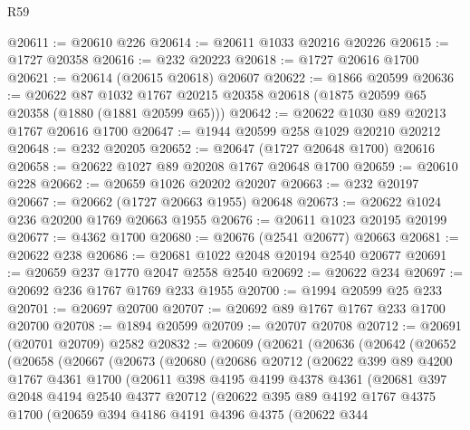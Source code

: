 \begin{lexlean}{R59}
\begin{coremodule}
@20611 := @20610 @226
@20614 := @20611 @1033 @20216 @20226
@20615 := @1727 @20358
@20616 := @232 @20223
@20618 := @1727 @20616 @1700
@20621 := @20614 (@20615 @20618) @20607
@20622 := @1866 @20599
@20636 := @20622
    @87
    @1032
    @1767
    @20215
    @20358
    @20618
    (@1875 @20599 @65 @20358 (@1880 (@1881 @20599 @65)))
@20642 := @20622 @1030 @89 @20213 @1767 @20616 @1700
@20647 := @1944 @20599 @258 @1029 @20210 @20212
@20648 := @232 @20205
@20652 := @20647 (@1727 @20648 @1700) @20616
@20658 := @20622 @1027 @89 @20208 @1767 @20648 @1700
@20659 := @20610 @228
@20662 := @20659 @1026 @20202 @20207
@20663 := @232 @20197
@20667 := @20662 (@1727 @20663 @1955) @20648
@20673 := @20622 @1024 @236 @20200 @1769 @20663 @1955
@20676 := @20611 @1023 @20195 @20199
@20677 := @4362 @1700
@20680 := @20676 (@2541 @20677) @20663
@20681 := @20622 @238
@20686 := @20681 @1022 @2048 @20194 @2540 @20677
@20691 := @20659 @237 @1770 @2047 @2558 @2540
@20692 := @20622 @234
@20697 := @20692 @236 @1767 @1769 @233 @1955
@20700 := @1994 @20599 @25 @233
@20701 := @20697 @20700
@20707 := @20692 @89 @1767 @1767 @233 @1700 @20700
@20708 := @1894 @20599
@20709 := @20707 @20708
@20712 := @20691 (@20701 @20709) @2582
@20832 := @20609
    (@20621
      (@20636
        (@20642
          (@20652
            (@20658
              (@20667
                (@20673
                  (@20680
                    (@20686
                      @20712
                      (@20622
                        @399
                        @89
                        @4200
                        @1767
                        @4361
                        @1700
                        (@20611
                          @398
                          @4195
                          @4199
                          @4378
                          @4361
                          (@20681
                            @397
                            @2048
                            @4194
                            @2540
                            @4377
                            @20712
                            (@20622
                              @395
                              @89
                              @4192
                              @1767
                              @4375
                              @1700
                              (@20659
                                @394
                                @4186
                                @4191
                                @4396
                                @4375
                                (@20622
                                  @344

\end{coremodule}
\end{lexlean}
